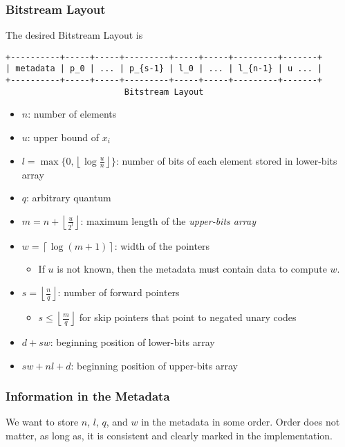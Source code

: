 \documentclass[10pt]{article}
\begin{document}
\subsubsection{Bitstream Layout}\label{bitstream-layout}
The desired Bitstream Layout is
\begin{verbatim}
+----------+-----+-----+---------+-----+-----+---------+-------+
| metadata | p_0 | ... | p_{s-1} | l_0 | ... | l_{n-1} | u ... |
+----------+-----+-----+---------+-----+-----+---------+-------+
                        Bitstream Layout
\end{verbatim}
\begin{itemize}
\item
    \(n\): number of elements
\item
    \(u\): upper bound of \(x_i\)
\item
    \(l = \max{\lbrace 0, \left \lfloor\log{\frac{u}{n}} \right \rfloor \rbrace } \):
    number of bits of each element stored in lower-bits array
\item
    \(q\): arbitrary quantum
\item
    \(m = n + \left \lfloor \frac{u}{2^l} \right \rfloor \):
    maximum length of the \textit{upper-bits array}
\item
    \(w = \left \lceil \log{(m + 1)} \right \rceil  \):
    width of the pointers
    \begin{itemize}
    \item
        If \(u\) is not known, then the metadata must contain data
        to compute \(w\).
    \end{itemize}
\item
    \(s = \left \lfloor \frac{n}{q} \right \rfloor \):
    number of forward pointers
    \begin{itemize}
    \item
        \(s \leq \left \lfloor \frac{m}{q} \right \rfloor \)
        for skip pointers that point to negated unary codes
    \end{itemize}
\item
    \(d + sw\): 
    beginning position of lower-bits array
\item
    \(sw + nl + d\): 
    beginning position of upper-bits array
\end{itemize}

\subsubsection{Information in the Metadata}\label{metadata}
We want to store \(n\), \(l\), \(q\), and \(w\) in the metadata in some order.
Order does not matter, as long as, it is consistent and clearly marked in the implementation.
\end{document}
